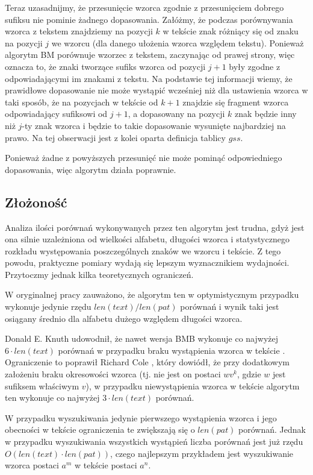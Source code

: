 Teraz uzasadnijmy, że przesunięcie wzorca zgodnie z przesunięciem dobrego sufiksu nie pominie żadnego dopasowania. Załóżmy, że podczas porównywania wzorca z tekstem znajdziemy na pozycji $k$ w tekście znak różniący się od znaku na pozycji $j$ we wzorcu (dla danego ułożenia wzorca względem tekstu). Ponieważ algorytm BM porównuje wzorzec z tekstem, zaczynając od prawej strony, więc oznacza to, że znaki tworzące sufiks wzorca od pozycji $j+1$ były zgodne z odpowiadającymi im znakami z tekstu. Na podstawie tej informacji wiemy, że prawidłowe dopasowanie nie może wystąpić wcześniej niż dla ustawienia wzorca w taki sposób, że na pozycjach w tekście od $k+1$ znajdzie się fragment wzorca odpowiadający sufiksowi od $j+1$, a dopasowany na pozycji $k$ znak będzie inny niż $j$-ty znak wzorca i będzie to takie dopasowanie wysunięte najbardziej na prawo. Na tej obserwacji jest z kolei oparta definicja tablicy $gss$.

Ponieważ żadne z powyższych przesunięć nie może pominąć odpowiedniego dopasowania, więc algorytm działa poprawnie.

\subsection{Złożoność}
Analiza ilości porównań wykonywanych przez ten algorytm jest trudna, gdyż jest ona silnie uzależniona od wielkości alfabetu, długości wzorca i statystycznego rozkładu występowania poszczególnych znaków we wzorcu i tekście. Z tego powodu, praktyczne pomiary wydają się lepszym wyznacznikiem wydajności. Przytoczmy jednak kilka teoretycznych ograniczeń. 

W oryginalnej pracy zauważono, że algorytm ten w optymistycznym przypadku wykonuje jedynie rzędu $len(text)/len(pat)$ porównań i wynik taki jest osiągany średnio dla alfabetu dużego względem długości wzorca.

Donald E. Knuth udowodnił, że nawet wersja BMB wykonuje co najwyżej $6 \cdot len(text)$ porównań w przypadku braku wystąpienia wzorca w tekście \cite{KMP}. Ograniczenie to poprawił Richard Cole \cite{BM-Cole}, który dowiódł, że przy dodatkowym założeniu braku okresowości wzorca (tj. nie jest on postaci $wv^{k}$, gdzie $w$ jest sufiksem właściwym $v$), w przypadku niewystąpienia wzorca w tekście algorytm ten wykonuje co najwyżej $3 \cdot len(text)$ porównań.

W przypadku wyszukiwania jedynie pierwszego wystąpienia wzorca i jego obecności w tekście ograniczenia te zwiększają się o $len(pat)$ porównań. Jednak w przypadku wyszukiwania wszystkich wystąpień liczba porównań jest już rzędu $O(len(text) \cdot len(pat))$, czego najlepszym przykładem jest wyszukiwanie wzorca postaci $a^{m}$ w tekście postaci $a^{n}$. 

